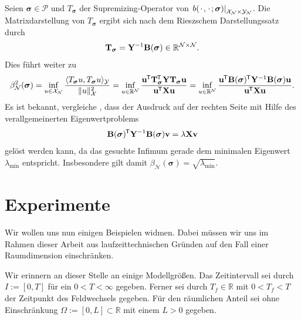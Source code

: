 \documentclass[../main.tex]{subfiles}
\begin{document}
Seien $\bm \sigma \in \mathcal P$ und $T_{\bm \sigma}$ der Supremizing-Operator von $\left.b({\mkern2mu\cdot\mkern2mu}, {\mkern2mu\cdot\mkern2mu}; \bm \sigma)\right|_{\mathcal X_{\mathcal N} \times \mathcal Y_{\mathcal N}}$.
Die Matrixdarstellung von $T_{\bm \sigma}$ ergibt sich nach dem Rieszschem Darstellungssatz durch
\begin{equation}
    \mathbf{T}_{\bm \sigma} = \mathbf{Y}^{-1} \mathbf{B}(\bm \sigma) \in \mathbb{R}^{\mathcal N \times \mathcal N}.
\end{equation}
Dies führt weiter zu
\begin{equation}
    \beta_{\mathcal N}^{2}(\bm \sigma)
    = \inf_{u \in \mathcal X_{\mathcal N}} \frac{\langle T_{\bm \sigma} u,T_{\bm \sigma} u\rangle_{\mathcal Y}}{\lVert u\rVert_{\mathcal X}^{2}}
    = \inf_{u \in \mathbb{R}^{\mathcal N}} \frac{\mathbf{u}^{\mkern-1.5mu\mathsf{T}} \mathbf{T}_{\bm \sigma}^{\mkern-1.5mu\mathsf{T}} \mathbf{Y} \mathbf{T}_{\bm \sigma} \mathbf{u}}{\mathbf{u}^{\mkern-1.5mu\mathsf{T}} \mathbf{X} \mathbf{u}}
    = \inf_{u \in \mathbb{R}^{\mathcal N}} \frac{\mathbf{u}^{\mkern-1.5mu\mathsf{T}} \mathbf{B}(\bm \sigma)^{\mkern-1.5mu\mathsf{T}} \mathbf{Y}^{-1} \mathbf{B}(\bm \sigma) \mathbf{u}}{\mathbf{u}^{\mkern-1.5mu\mathsf{T}} \mathbf{X} \mathbf{u}}.
\end{equation}
Es ist bekannt, vergleiche \cite[Subsection 1.3.5]{Patera:2007un}, dass der Ausdruck auf der rechten Seite mit Hilfe des verallgemeinerten Eigenwertproblems
\begin{equation}
    \mathbf{B}(\bm \sigma)^{\mkern-1.5mu\mathsf{T}} \mathbf{Y}^{-1} \mathbf{B}(\bm \sigma) \mathbf{v} = \lambda \mathbf{X} \mathbf{v}
\end{equation}
gelöst werden kann, da das gesuchte Infimum gerade dem minimalen Eigenwert $\lambda_{\min}$ entspricht.
Insbesondere gilt damit $\beta_{\mathcal N}(\bm \sigma) = \sqrt{\lambda_{\min}}$.


\section{Experimente} %
\label{sec:experimente}

Wir wollen uns nun einigen Beispielen widmen.
Dabei müssen wir uns im Rahmen dieser Arbeit aus laufzeittechnischen Gründen auf den Fall einer Raumdimension einschränken.

Wir erinnern an dieser Stelle an einige Modellgrößen.
Das Zeitintervall sei durch $I := [0, T]$ für ein $0 < T < \infty$ gegeben.
Ferner sei durch $T_{f} \in \mathbb{R}$ mit $0 < T_{f} < T$ der Zeitpunkt des Feldwechsels gegeben.
Für den räumlichen Anteil sei ohne Einschränkung $\Omega := [0, L] \subset \mathbb{R}$ mit einem $L > 0$ gegeben.
\end{document}

